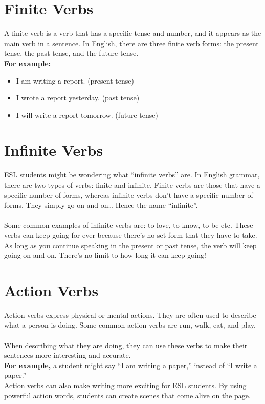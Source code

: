\newpage
\section{Finite Verbs}
A finite verb is a verb that has a specific tense and number, and it appears as the main verb in a sentence. 
In English, there are three finite verb forms: the present tense, the past tense, and the future tense.\\
\textbf{For example:}
\begin{itemize}
    \item I am writing a report. (present tense)
    \item I wrote a report yesterday. (past tense)
    \item I will write a report tomorrow. (future tense)
\end{itemize}

\section{Infinite Verbs}
ESL students might be wondering what “infinite verbs” are. 
In English grammar, there are two types of verbs: finite and infinite. 
Finite verbs are those that have a specific number of forms, whereas infinite verbs don’t have a specific number of forms. 
They simply go on and on… Hence the name “infinite”.\\\\
Some common examples of infinite verbs are: to love, to know, to be etc. 
These verbs can keep going for ever because there’s no set form that they have to take. 
As long as you continue speaking in the present or past tense, the verb will keep going on and on. There’s no limit to how long it can keep going!

\newpage
\section{Action Verbs}
Action verbs express physical or mental actions. 
They are often used to describe what a person is doing. 
Some common action verbs are run, walk, eat, and play.\\\\
When describing what they are doing, they can use these verbs to make their sentences more interesting and accurate. \\
\textbf{For example,} a student might say “I am writing a paper,” instead of “I write a paper.”\\
Action verbs can also make writing more exciting for ESL students. 
By using powerful action words, students can create scenes that come alive on the page.

